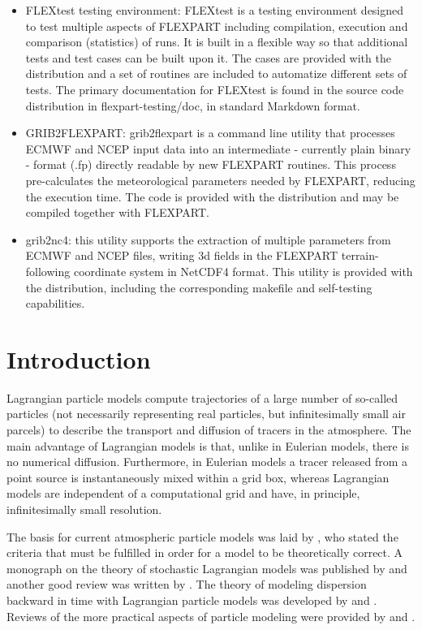 \documentclass{egu}                  %
\begin{document}
\begin{itemize} 

\item FLEXtest testing environment: FLEXtest is a testing environment designed to test multiple aspects of FLEXPART including compilation, execution and comparison (statistics) of runs. It is built in a flexible way so that additional tests and test cases can be built upon it. The cases are provided with the distribution and a set of routines are included to automatize different sets of tests. The primary documentation for FLEXtest is found in the source code distribution in flexpart-testing/doc, in standard Markdown format.

\item GRIB2FLEXPART: grib2flexpart is a command line utility that processes ECMWF and NCEP input data into an intermediate - currently plain binary - format (.fp) directly readable by new FLEXPART routines. This process pre-calculates the meteorological parameters needed by FLEXPART, reducing the execution time. The code is provided with the distribution and may be compiled together with FLEXPART.  

\item grib2nc4: this utility supports the extraction of multiple parameters from ECMWF and NCEP files, writing 3d fields in the FLEXPART terrain-following coordinate system in NetCDF4 format. This utility is provided with the distribution, including the corresponding makefile and self-testing capabilities.

\end{itemize}


\section{Introduction}

Lagrangian particle models compute trajectories of a large number of so-called
particles (not necessarily representing real particles, but infinitesimally
small air parcels) to describe the transport and diffusion of tracers in the
atmosphere.  The main advantage of Lagrangian models is that, unlike in
Eulerian models, there is no numerical diffusion.  Furthermore, in Eulerian
models a tracer released from a point source is instantaneously mixed within a
grid box, whereas Lagrangian models are independent of a computational grid and
have, in principle, infinitesimally small resolution.

The basis for current atmospheric particle models was laid by
\citet{thomson1987}, who stated the criteria that must be fulfilled in order
for a model to be theoretically correct.  A monograph on the theory of
stochastic Lagrangian models was published by \citet{rodean1996} and another
good review was written by \citet{wilson1996}.  The theory of modeling
dispersion backward in time with Lagrangian particle models was developed by
\citet{flesch1995} and \citet{seibert2004}.  Reviews of the more practical
aspects of particle modeling were provided by \citet{zannetti1992} and
\citet{uliasz1994}.
\end{document}
